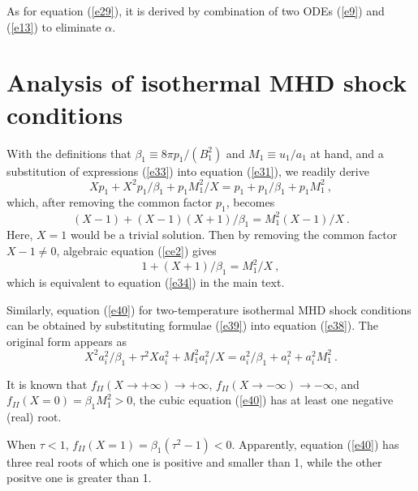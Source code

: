 \documentclass[fleqn,usenatbib]{mnras}
\begin{document}
As for equation (\ref{e29}), it is derived by combination of two ODEs (\ref{e9}) and (\ref{e13}) to eliminate $\alpha$.

\section{Analysis of isothermal MHD shock conditions}
\label{a3}
With the definitions that $\beta_{1}\equiv 8\pi p_{1}/(B_{1}^{2})$ and $M_{1}\equiv u_{1}/a_{1}$ at hand, and a substitution of expressions (\ref{e33}) into equation (\ref{e31}), we readily derive 
\begin{equation}
Xp_{1}+X^{2}p_{1}/\beta_{1}+p_{1}M_{1}^{2}/X=p_{1}+p_{1}/\beta_{1}+p_{1}M_{1}^{2}\ ,
\end{equation}
which, after removing the common factor $p_{1}$, becomes
\begin{equation}
(X-1)+(X-1)(X+1)/\beta_{1}=M^{2}_{1}(X-1)/X\ .\label{ce2}
\end{equation}
Here, $X=1$ would be a trivial solution. Then by removing the common factor $X-1\neq 0$, algebraic equation (\ref{ce2}) gives
\begin{equation}
1+(X+1)/\beta_{1}=M^{2}_{1}/X\ ,
\end{equation}
which is equivalent to equation (\ref{e34}) in the main text.

Similarly, equation (\ref{e40}) for two-temperature isothermal MHD shock conditions can be obtained by substituting formulae (\ref{e39}) into equation (\ref{e38}). The original form appears as
\begin{equation}
X^{2}a_{i}^{2}/\beta_{1}+\tau^{2}X a_{i}^{2}+M_{1}^{2}a_{i}^{2}/X=a_{i}^{2}/\beta_{1}+a_{i}^{2}+a_{i}^{2}M_{1}^{2}\ .
\end{equation}

It is known that $f_{II}(X\rightarrow +\infty)\rightarrow +\infty$, $f_{II}(X\rightarrow -\infty)\rightarrow -\infty$, and $f_{II}(X=0)=\beta_{1}M_{1}^{2}>0$, the cubic equation (\ref{e40}) has at least one negative (real) root.

When $\tau<1$, $f_{II}(X=1)=\beta_{1}\left(\tau^{2}-1\right)<0$. Apparently, equation (\ref{e40}) has three real roots of which one is positive and smaller than 1, while the other positve one is greater than 1.
\end{document}
